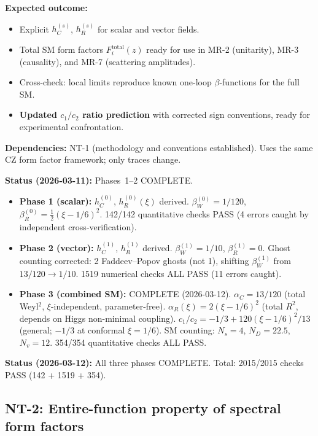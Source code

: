 \documentclass[12pt,a4paper]{article}
\newcommand{\half}{\tfrac{1}{2}}
\newcommand{\outcome}[1]{\noindent\textbf{Expected outcome:} #1\par}
\newcommand{\deps}[1]{\noindent\textbf{Dependencies:} #1\par}
\begin{document}
\outcome{
\begin{itemize}
  \item Explicit $h_C^{(s)}$, $h_R^{(s)}$ for scalar and vector fields.
  \item Total SM form factors $F_i^{\text{total}}(z)$ ready for use in
    MR-2 (unitarity), MR-3 (causality), and MR-7 (scattering amplitudes).
  \item Cross-check: local limits reproduce known one-loop $\beta$-functions
    for the full SM.
  \item \textbf{Updated $c_1/c_2$ ratio prediction} with corrected sign
    conventions, ready for experimental confrontation.
\end{itemize}
}

\deps{NT-1 (methodology and conventions established). Uses the same CZ form
factor framework; only traces change.}

\textbf{Status (2026-03-11):} Phases~1--2 \textcolor{proven}{COMPLETE.}
\begin{itemize}
  \item \textbf{Phase 1 (scalar):} $h_C^{(0)}$, $h_R^{(0)}(\xi)$ derived.
    $\beta_W^{(0)} = 1/120$, $\beta_R^{(0)} = \half(\xi - 1/6)^2$.
    142/142 quantitative checks PASS (4 errors caught by independent cross-verification).
  \item \textbf{Phase 2 (vector):} $h_C^{(1)}$, $h_R^{(1)}$ derived.
    $\beta_W^{(1)} = 1/10$, $\beta_R^{(1)} = 0$.
    Ghost counting corrected: 2 Faddeev--Popov ghosts (not 1), shifting
    $\beta_W^{(1)}$ from $13/120 \to 1/10$.
    1519 numerical checks ALL PASS (11 errors caught).
  \item \textbf{Phase 3 (combined SM):} \textcolor{proven}{COMPLETE (2026-03-12).}
    $\alpha_C = 13/120$ (total Weyl${}^2$, $\xi$-independent, parameter-free).
    $\alpha_R(\xi) = 2(\xi - 1/6)^2$ (total $R^2$, depends on Higgs non-minimal coupling).
    $c_1/c_2 = -1/3 + 120(\xi-1/6)^2/13$ (general; $-1/3$ at conformal $\xi=1/6$).
    SM counting: $N_s=4$, $N_D=22.5$, $N_v=12$.
    354/354 quantitative checks ALL PASS.
\end{itemize}

\textbf{Status (2026-03-12):} All three phases \textcolor{proven}{COMPLETE.}
Total: 2015/2015 checks PASS (142 + 1519 + 354).

\subsection{NT-2: Entire-function property of spectral form factors}
\label{task:NT2}
\end{document}
